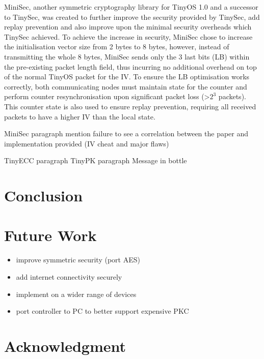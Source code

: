 \documentclass[conference]{./sty/IEEEtran}
\begin{document}
MiniSec, another symmetric cryptography library for TinyOS 1.0 and a successor to TinySec, was created to further improve the security provided by TinySec, add replay prevention and also improve upon the minimal security overheads which TinySec achieved. To achieve the increase in security, MiniSec chose to increase the initialisation vector size from 2 bytes to 8 bytes, however, instead of transmitting the whole 8 bytes, MiniSec sends only the 3 last bits (LB) within the pre-existing packet length field, thus incurring no additional overhead on top of the normal TinyOS packet for the IV. To ensure the LB optimisation works correctly, both communicating nodes must maintain state for the counter and perform counter resynchronisation upon significant packet loss (\textgreater$2^3$ packets). This counter state is also used to ensure replay prevention, requiring all received packets to have a higher IV than the local state.

MiniSec paragraph \cite{MiniSec} mention failure to see a correlation between the paper and implementation provided (IV cheat and major flaws)



TinyECC paragraph \cite{TinyECC}
TinyPK paragraph \cite{TinyPK}
Message in bottle \cite{MessageBottle}

\section{Conclusion}


\section{Future Work} %
\label{sec:future_work}

\begin{itemize}
  \item improve symmetric security (port AES)
  \item add internet connectivity securely
  \item implement on a wider range of devices
  \item port controller to PC to better support expensive PKC
\end{itemize}



\section*{Acknowledgment}
\end{document}
